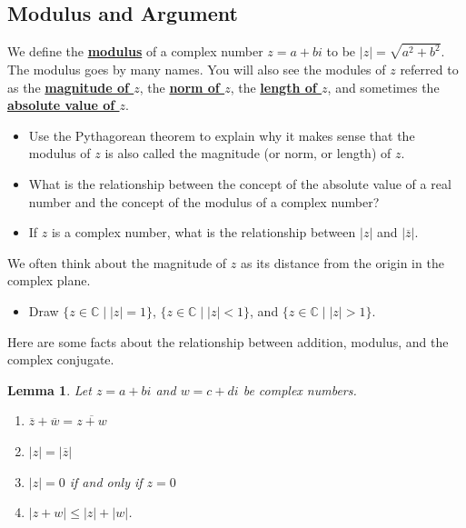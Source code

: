 \documentclass[11pt]{article}
\newenvironment{task}
	{\begin{mdframed}[linecolor=lightgray, linewidth=3pt]\raggedright}
	{\end{mdframed}}
\renewcommand\emph[1]{\underline{\bf{#1}}} %
\newtheorem{lemma}[theorem]{Lemma}
\theoremstyle{definition}
\begin{document}
\subsection{Modulus and Argument}

We define the \emph{modulus} of a complex number $z=a+bi$ to be $|z| = \sqrt{a^2+b^2}$. The modulus goes by many names. You will also see the modules of $z$
referred to as the \emph{magnitude of $z$}, the \emph{norm of $z$}, the \emph{length of $z$}, and sometimes the \emph{absolute value of $z$}.

\begin{task}
  \begin{itemize}
    \item Use the Pythagorean theorem to explain why it makes sense that the modulus of $z$ is also called the magnitude (or norm, or length) of $z$.
    \item What is the relationship between the concept of the absolute value of a real number and the concept of the modulus of a complex number?
    \item If $z$ is a complex number, what is the relationship between $|z|$ and $|\overline{z}|$.
  \end{itemize}
\end{task}

We often think about the magnitude of $z$ as its distance from the origin in the complex plane.

\begin{task}
  \begin{itemize}
    \item Draw $\{ z\in \mathbb{C} \mid |z| = 1 \}$, $\{ z\in \mathbb{C} \mid |z| < 1 \}$, and $\{ z\in \mathbb{C} \mid |z| > 1 \}$.
  \end{itemize}
\end{task}


Here are some facts about the relationship between addition, modulus, and the complex conjugate.

\begin{lemma} Let $z=a+bi$ and $w=c+di$ be complex numbers.
  \begin{enumerate}
    \item $\overline{z} + \overline{w} = \overline{z+w}$
    \item $|z| = |\overline{z}|$
    \item $|z|=0$ if and only if $z=0$
    \item $|z+w| \leq |z| + |w|$.
  \end{enumerate}
\end{lemma}
\end{document}

